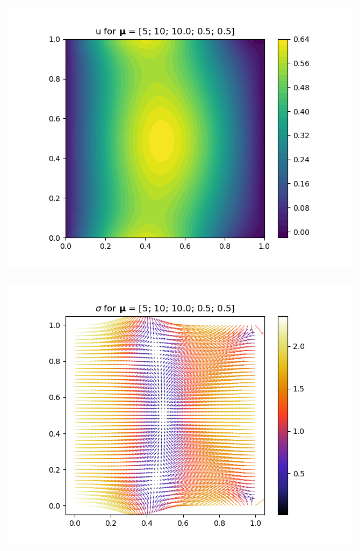 \begin{figure}[!htb]
\begin{subfigure}{0.35\linewidth}
        \includegraphics[width=\linewidth]{figs/mixed_u_mu3.png}
        \label{subfig:mu3_a}
    \end{subfigure}%
    \begin{subfigure}{0.35\linewidth}
        \centering
        \includegraphics[width=\linewidth]{figs/mixed_sig_mu3.png}
        \label{subfig:mu3_b}
    \end{subfigure}
    \begin{subfigure}{0.4\linewidth}
        \centering

\end{subfigure}
\end{figure}
